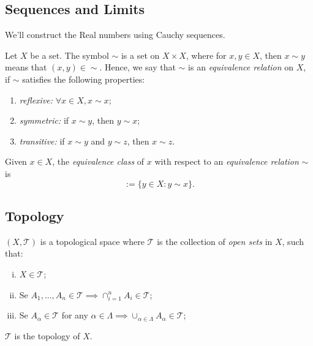 \subsection{Sequences and Limits}

We'll construct the Real numbers using Cauchy sequences.

\begin{definition}
	Let $X$ be a set. The symbol $\sim$ is a set on $X \times X$, where
	for $x,y \in X$, then $x \sim y$ means that $(x,y) \in \sim$. Hence,
	we say that $\sim$ is an \textit{equivalence relation} on $X$, if $\sim$ satisfies
	the following properties:
	\begin{enumerate}
		\item \textit{reflexive:} $\forall x \in X, x \sim x$;
		\item \textit{symmetric:} if $x \sim y$, then $y \sim x$;
		\item \textit{transitive:} if $x \sim y$ and $y \sim z$, then $x \sim z$.
	\end{enumerate}
\end{definition}

\begin{definition}
	Given $x \in X$, the \textit{equivalence class} of $x$ with respect
	to an \textit{equivalence relation} $\sim$ is
	\begin{equation}
		[x]:=\{
		y \in X: y \sim x
		\}.
		\label{eq:eqclass}
	\end{equation}
\end{definition}

\subsection{Topology}

\begin{definition}
	$(X,\mathcal T)$ is a topological space where $\mathcal T$ is the collection of \textit{open
		sets} in $X$, such that:
	\begin{enumerate}[(i)]
		\item $X \in \mathcal T$;
		\item Se $A_1,...,A_n \in \mathcal T \implies \cap_{i=1}^n A_i \in \mathcal T$;
		\item Se $A_\alpha \in \mathcal T$ for any $\alpha \in \Lambda \implies \cup_{\alpha \in \Lambda} A_\alpha \in \mathcal T$;
	\end{enumerate}
	$\mathcal T$ is the topology of $X$.
\end{definition}

